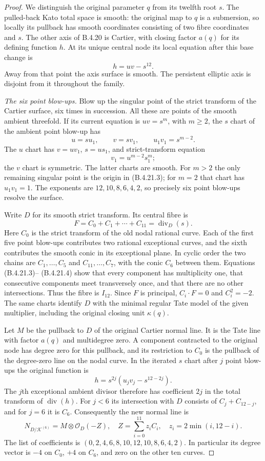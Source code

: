 \begin{proof}
We distinguish the original parameter $q$ from its twelfth root
$s$.  The pulled-back Kato total space is smooth: the original
map to $q$ is a submersion, so locally its pullback has smooth
coordinates consisting of two fibre coordinates and $s$.
The other axis of B.4.20 is Cartier, with closing factor $a(q)$
for its defining function $h$.  At its unique central node its
local equation after this base change is
\[
 h=uv-s^{12}.
 \tag{B.4.21.2}
\]
Away from that point the axis surface is smooth.  The persistent
elliptic axis is disjoint from it throughout the family.

\emph{The six point blow-ups.}
Blow up the singular point of the strict transform of the
Cartier surface, six times in succession.  All these are points
of the smooth ambient threefold.  If its current equation is
$uv=s^m$, with $m\ge2$, the $s$ chart of the ambient point
blow-up has
\[
 u=su_1,\qquad v=sv_1,
 \qquad u_1v_1=s^{m-2}.
 \tag{B.4.21.3}
\]
The $u$ chart has $v=uv_1$, $s=us_1$, and strict-transform
equation
\[
 v_1=u^{m-2}s_1^m;
 \tag{B.4.21.4}
\]
the $v$ chart is symmetric.  The latter charts are smooth.
For $m>2$ the only remaining singular point is the origin in
(B.4.21.3); for $m=2$ that chart has $u_1v_1=1$.
The exponents are $12,10,8,6,4,2$, so precisely six point
blow-ups resolve the surface.

Write $D$ for its smooth strict transform.  Its central fibre is
\[
 F=C_0+C_1+\cdots+C_{11}=\operatorname{div}_D(s).
 \tag{B.4.21.5}
\]
Here $C_0$ is the strict transform of the old nodal rational
curve.  Each of the first five point blow-ups contributes two
rational exceptional curves, and the sixth contributes the
smooth conic in its exceptional plane.  In cyclic order the
two chains are $C_1,\ldots,C_5$ and $C_{11},\ldots,C_7$, with
the conic $C_6$ between them.  Equations (B.4.21.3)--
(B.4.21.4) show that every component has multiplicity one,
that consecutive components meet transversely once, and that
there are no other intersections.  Thus the fibre is $I_{12}$.
Since $F$ is principal, $C_i\cdot F=0$ and $C_i^2=-2$.
The same charts identify $D$ with the minimal regular Tate
model of the given multiplier, including the original closing
unit $\kappa(q)$.

Let $M$ be the pullback to $D$ of the original Cartier normal
line.  It is the Tate line with factor $a(q)$ and multidegree
zero.  A component contracted to the original node has degree
zero for this pullback, and its restriction to $C_0$ is the
pullback of the degree-zero line on the nodal curve.
In the iterated $s$ chart after $j$ point blow-ups the original
function is
\[
 h=s^{2j}(u_jv_j-s^{12-2j}).
\]
The $j$th exceptional ambient divisor therefore has coefficient
$2j$ in the total transform of $\operatorname{div}(h)$.
For $j<6$ its intersection with $D$ consists of
$C_j+C_{12-j}$, and for $j=6$ it is $C_6$.
Consequently the new normal line is
\[
 N_{D/\mathcal K^{(6)}}=M\otimes\mathcal O_D(-Z),
 \quad Z=\sum_{i=0}^{11}z_iC_i,
 \quad z_i=2\min(i,12-i).
 \tag{B.4.21.6}
\]
The list of coefficients is
$(0,2,4,6,8,10,12,10,8,6,4,2)$.
In particular its degree vector is $-4$ on $C_0$, $+4$ on
$C_6$, and zero on the other ten curves.


\end{proof}
